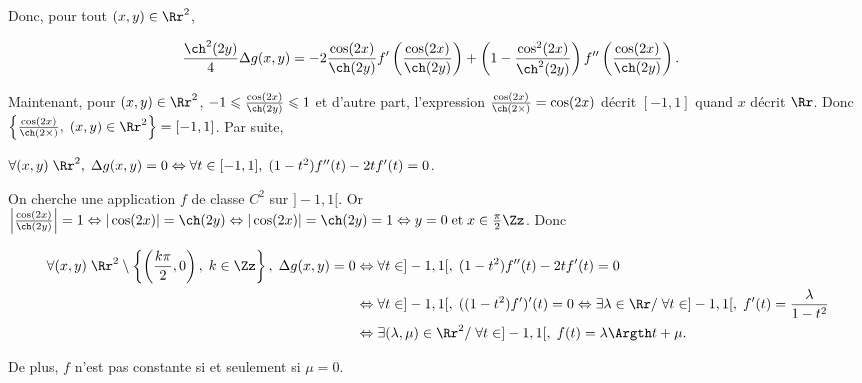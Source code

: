{{Donc, pour tout $(x,y)\in\Rr^2$,

\begin{align*}\ensuremath
 \frac{\ch^2(2y)}{4}\Delta g(x,y)&=-2 \frac{\cos(2x)}{\ch(2y)}f'\left( \frac{\cos(2x)}{\ch(2y)}\right)+\left(1- \frac{\cos^2(2x)}{\ch^2(2y)}\right)f''\left( \frac{\cos(2x)}{\ch(2y)}\right).
\end{align*}

Maintenant, pour $(x,y)\in\Rr^2$, $-1\leqslant  \frac{\cos(2x)}{\ch(2y)}\leqslant1$ et d'autre part, l'expression  $ \frac{\cos(2x)}{\ch(2\times)}=\cos(2x)$ décrit $[-1,1]$ quand $x$ décrit $\Rr$. Donc $\left\{ \frac{\cos(2x)}{\ch(2\times)},\;(x,y)\in\Rr^2\right\}=[-1,1]$. Par suite,

\begin{center}
$\forall(x,y)\;\Rr^2,\;\Delta g(x,y)=0\Leftrightarrow\forall t\in[-1,1],\;(1-t^2)f''(t)-2tf'(t)=0$.
\end{center}

On cherche une application $f$ de classe $C^2$ sur $]-1,1[$. Or $\left| \frac{\cos(2x)}{\ch(2y)}\right|=1\Leftrightarrow|\cos(2x)|=\ch(2y)\Leftrightarrow|\cos(2x)|=\ch(2y)=1\Leftrightarrow y=0\;\text{et}\;x\in \frac{\pi}{2}\Zz$. Donc

\begin{align*}\ensuremath
\forall(x,y)\;\Rr^2\setminus\left\{\left( \frac{k\pi}{2},0\right),\;k\in\Zz\right\},\;\Delta g(x,y)=0&\Leftrightarrow\forall t\in]-1,1[,\;(1-t^2)f''(t)-2tf'(t)=0\\
 &\Leftrightarrow\forall t\in]-1,1[,\;((1-t^2)f')'(t)=0\Leftrightarrow\exists\lambda\in\Rr/\;\forall t\in]-1,1[,\;f'(t)= \frac{\lambda}{1-t^2}\\
 &\Leftrightarrow\exists(\lambda,\mu)\in\Rr^2/\;\forall t\in]-1,1[,\;f(t)=\lambda\Argth t+\mu.
\end{align*}

De plus, $f$ n'est pas constante si et seulement si $\mu=0$.

\begin{center}
\end{center}
}
}
